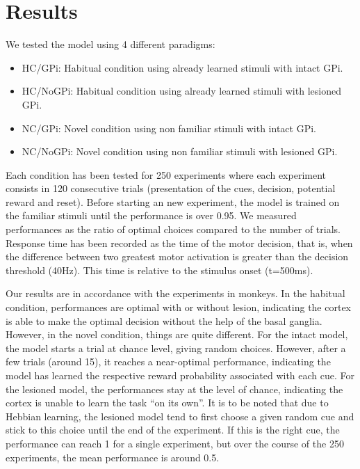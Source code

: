 \section{Results}
We tested the model using 4 different paradigms:
\begin{itemize}
\item HC/GPi:   Habitual condition using already learned stimuli with intact GPi.
\item HC/NoGPi: Habitual condition using already learned stimuli with lesioned GPi.
\item NC/GPi:   Novel condition using non familiar stimuli with intact GPi.
\item NC/NoGPi: Novel condition using non familiar stimuli with lesioned GPi.
\end{itemize}
Each condition has been tested for 250 experiments where each experiment
consists in 120 consecutive trials (presentation of the cues, decision,
potential reward and reset). Before starting an new experiment, the model is
trained on the familiar stimuli until the performance is over 0.95. We measured
performances as the ratio of optimal choices compared to the number of
trials. Response time has been recorded as the time of the motor decision, that
is, when the difference between two greatest motor activation is greater than
the decision threshold (40Hz). This time is relative to the stimulus onset
(t=500ms).

Our results are in accordance with the experiments in monkeys. In the habitual
condition, performances are optimal with or without lesion, indicating the
cortex is able to make the optimal decision without the help of the basal
ganglia. However, in the novel condition, things are quite different. For the
intact model, the model starts a trial at chance level, giving random
choices. However, after a few trials (around 15), it reaches a near-optimal
performance, indicating the model has learned the respective reward probability
associated with each cue. For the lesioned model, the performances stay at the
level of chance, indicating the cortex is unable to learn the task ``on its
own''. It is to be noted that due to Hebbian learning, the lesioned model tend
to first choose a given random cue and stick to this choice until the end of
the experiment. If this is the right cue, the performance can reach 1 for a
single experiment, but over the course of the 250 experiments, the mean
performance is around 0.5.




